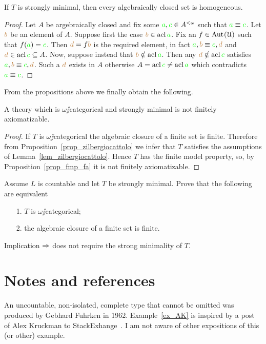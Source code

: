 \documentclass[creche.tex]{subfiles}
\begin{document}
\begin{proposition}\label{prop_zilbergiocattolo} If $T$ is strongly minimal, then every algebraically closed set is homogeneous.
\end{proposition}
\begin{proof}
Let $A$ be argebraically closed and fix some ${\color{green} a},{\color{green} c}\in A^{<\omega}$ such that ${\color{green} a}\equiv{\color{green}c}$. Let ${\color{brown} b}$ be an element of $A$. Suppose first the case ${\color{brown} b}\in\mathop{\rm acl}{\color{green} a}$. Fix an $f\in\textrm{Aut\kern.15ex}(\EuScript U)$ such that $f({\color{green} a})={\color{green} c}$. Then ${\color{brown} d}=f{\color{brown} b}$ is the required element, in fact ${\color{green} a},{\color{brown} b}\equiv {\color{green}c},{\color{brown} d}$ and ${\color{brown} d}\in\mathop{\rm acl}{\color{green} c}\subseteq  A$. Now, suppose instead that ${\color{brown} b}\notin\mathop{\rm acl}{\color{green} a}$. Then any ${\color{brown} d}\notin\mathop{\rm acl}{\color{green} c}$ satisfies ${\color{green} a},{\color{brown} b}\equiv {\color{green}c},{\color{brown} d}$. Such a ${\color{brown} d}$ exists in $A$ otherwise $A=\mathop{\rm acl}{\color{green} c}\neq\mathop{\rm acl}{\color{green} a}$ which contradicts ${\color{green} a}\equiv {\color{green}c}$.
\end{proof}

From the propositions above we finally obtain the following.

\begin{theorem}\label{thm_zilbergiocattolo}
A theory which is $\omega\jj$categorical and strongly minimal is not finitely axiomatizable.
\end{theorem}

\begin{proof}
If $T$ is $\omega\jj$categorical the algebraic closure of a finite set is finite. Therefore from Proposition~\ref{prop_zilbergiocattolo} we infer that $T$ satisfies the assumptions of Lemma~\ref{lem_zilbergiocattolo}. Hence $T$ has the finite model property, so, by Proposition~\ref{prop_fmp_fa} it is not finitely axiomatizable.
\end{proof}


\begin{exercise} 
Assume $L$ is countable and let $T$ be strongly minimal. Prove that the following are equivalent
\begin{itemize}
\item[1.] $T$ is $\omega\jj$categorical;
\item[2.] the algebraic closure of a finite set is finite.
\end{itemize}
Implication $\Rightarrow$ does not require the strong minimality of $T$.\QED
\end{exercise}




\section{Notes and references}
\label{Notes_countable}
An uncountable, non-isolated, complete type that cannot be omitted was produced by Gebhard Fuhrken in 1962. Example~\ref{ex_AK} is inspired by a post of Alex Kruckman to StackExhange~\cite{AK}. I am not aware of other expositions of this (or other) example.
\end{document}
